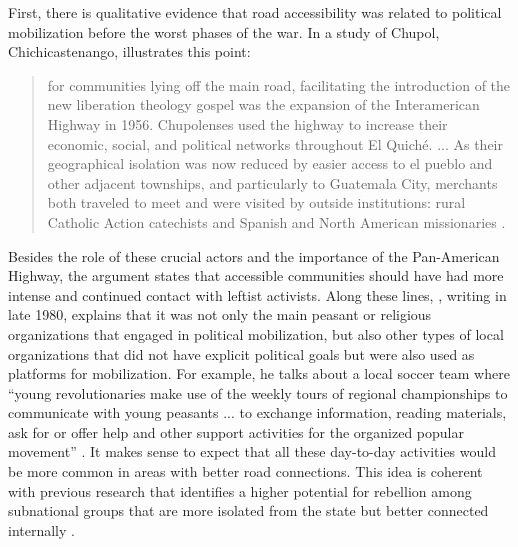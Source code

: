 \documentclass[12pt, notitlepage]{article}
\begin{document}

First, there is qualitative evidence that road accessibility was related to political mobilization before the worst phases of the war.
In a study of Chupol, Chichicastenango, \citet{Esparza:2018uw} illustrates this point:

\begin{quote}
  for communities lying off the main road, facilitating the introduction of the new liberation theology gospel was the expansion of the Interamerican Highway in 1956. Chupolenses used the highway to increase their economic, social, and political networks throughout El Quiché. ... As their geographical isolation was now reduced by easier access to el pueblo and other adjacent townships, and particularly to Guatemala City, merchants both traveled to meet and were visited by outside institutions: rural Catholic Action catechists and Spanish and North American missionaries \citep[93--94]{Esparza:2018uw}.
\end{quote}


Besides the role of these crucial actors and the importance of the Pan-American Highway, the argument states that accessible communities should have had more intense and continued contact with leftist activists.
Along these lines, \citet{Bran:1985tc}, writing in late 1980, explains that it was not only the main peasant or religious organizations that engaged in political mobilization, but also other types of local organizations that did not have explicit political goals but were also used as platforms for mobilization.
For example, he talks about a local soccer team where ``young revolutionaries make use of the weekly tours of regional championships to communicate with young peasants ... to exchange information, reading materials, ask for or offer help and other support activities for the organized popular movement'' \citep[15]{Bran:1985tc}.
It makes sense to expect that all these day-to-day activities would be more common in areas with better road connections.
This idea is coherent with previous research that identifies a higher potential for rebellion among subnational groups that are more isolated from the state but better connected internally \citep{Muller-Crepon:2021va}.
\end{document}
